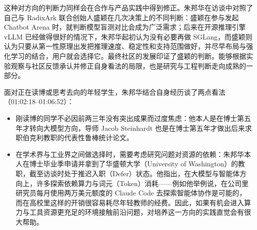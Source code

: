 \documentclass[UTF8,a4paper,11pt,fontset=fandol]{ctexart}
\begin{document}
这种对方向的判断力同样会在合作与产品实践中得到修正。朱邦华在访谈中对照了自己与 RadixArk 联合创始人盛颖在几次决策上的不同判断：盛颖在参与发起 Chatbot Arena 时，就判断模型盲测对比会成为广泛需求；后来在开源推理引擎 vLLM 已经做得很好的情况下，朱邦华起初认为没有必要再做 SGLang，而盛颖则认为只要从第一性原理出发把推理速度、稳定性和支持范围做好，并尽早布局与强化学习的结合，用户就会选择它。最终社区的发展印证了盛颖的判断。能够根据实验观察与社区反馈承认并修正自身看法的局限，也是研究与工程判断走向成熟的一部分。

面对正在读博或思考去向的年轻学生，朱邦华结合自身经历谈了两点看法（01:02:18–01:06:52）：
\begin{itemize}
\item 刚读博的同学不必因前两三年没有突出成果而过度焦虑：他本人是在博士第五年才转向大模型方向，导师 Jacob Steinhardt 也是在博士第五年才做出后来求职伯克利教职的代表性鲁棒统计论文。
\item 在学术界与工业界之间做选择时，需要考虑研究问题对资源的依赖：朱邦华本人在博士毕业季申请并拿到了华盛顿大学（University of Washington）的教职，截至访谈时处于推迟入职（Defer）状态。他指出，在大模型与智能体方向上，许多探索依赖算力与词元（Token）消耗——例如他举例说，在公司里研究员每月使用两万美元额度的 Claude Code 去探索智能体协作是可能的，而在高校里这样的开销很容易耗尽年轻教师的经费。因此，如果有机会进入算力与工具资源更充足的环境接触前沿问题，对培养这一方向的实践直觉会有很大帮助。
\end{itemize}
\end{document}
